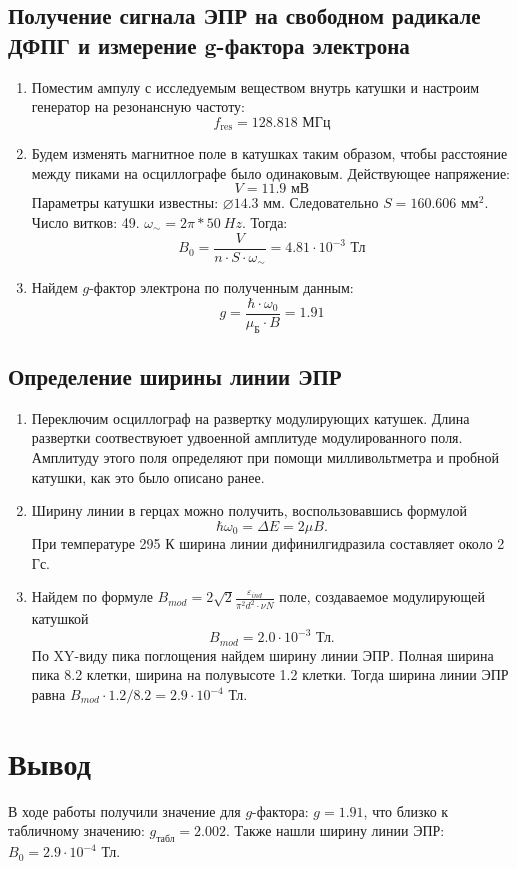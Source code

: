 \documentclass[a4paper, 12pt]{article}
\begin{document}
	\subsection{Получение сигнала ЭПР  на свободном радикале ДФПГ и измерение g-фактора электрона}
	\begin{enumerate}
		\item Поместим ампулу с исследуемым веществом внутрь катушки и настроим генератор на резонансную частоту:
		\begin{equation*}
			f_{\text{res}}=128.818\text{ МГц}
		\end{equation*}
		\item Будем изменять магнитное поле в катушках таким образом, чтобы расстояние между пиками на осциллографе было одинаковым. Действующее напряжение:
		\begin{equation*}
			V=11.9\text{ мВ}
		\end{equation*}
		Параметры катушки известны: $\diameter 14.3$ мм. Следовательно $S=160.606$ мм$^{2}$. Число витков: 49. $\omega_{\sim}=2\pi*50\ Hz$. Тогда:
		\begin{equation*}
			B_0=\frac{V}{n\cdot S\cdot\omega_{\sim}}=4.81\cdot 10^{-3}\text{ Тл}
		\end{equation*}
		\item Найдем $g$-фактор электрона по полученным данным:
		\begin{equation*}
			g=\frac{\hbar\cdot\omega_0}{\mu_{\text{Б}}\cdot B}=1.91
		\end{equation*}
	\end{enumerate}
	\subsection{Определение ширины линии ЭПР}
	\begin{enumerate}
		\item Переключим осциллограф на развертку модулирующих катушек. Длина развертки соотвествуюет удвоенной амплитуде модулированного поля. Амплитуду этого поля определяют при помощи милливольтметра и пробной катушки, как это было описано ранее.
		\item Ширину линии в герцах можно получить, воспользовавшись формулой
		\begin{equation}
			\hbar\omega_0=\Delta E=2\mu B.
		\end{equation}
		При температуре 295 К ширина линии дифинилгидразила составляет около 2 Гс.
		\item Найдем по формуле $B_{mod}=2\sqrt{2}\frac{\varepsilon_{ind}}{\pi^2 d^2\cdot \nu N}$ поле, создаваемое модулирующей катушкой
		\begin{equation*}
		B_{mod}=2.0 \cdot 10^{-3} \text{ Тл.}
		\end{equation*}
		По XY-виду пика поглощения найдем ширину линии ЭПР. Полная ширина пика 8.2 клетки, ширина на полувысоте 1.2 клетки. Тогда ширина линии ЭПР равна \newline$B_{mod}\cdot1.2/8.2=2.9 \cdot 10^{-4} \text{ Тл.}$
	\end{enumerate}
	\section{Вывод}
	В ходе работы получили значение для $g$-фактора: $g=1.91$, что близко к табличному значению: $g_{\text{табл}}=2.002$. Также нашли ширину линии ЭПР: $B_0=2.9 \cdot 10^{-4} \text{ Тл.}$
	
\end{document}
